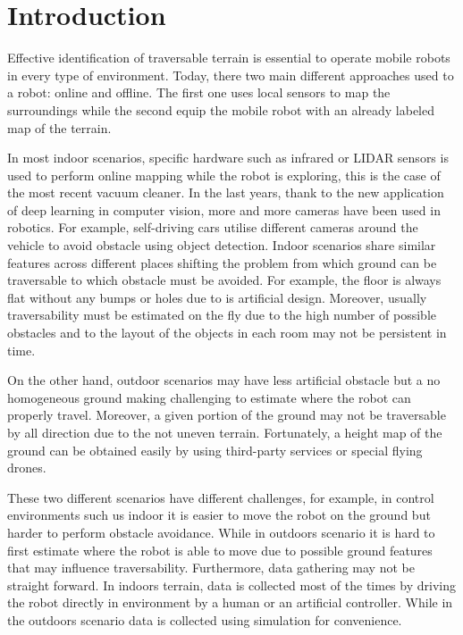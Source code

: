 \documentclass[../document.tex]{subfiles}
\begin{document}
\section{Introduction}
Effective identification of traversable terrain is essential to operate mobile robots in every type of environment. Today, there two main different approaches used to a robot: online and offline. The first one uses local sensors to map the surroundings while the second equip the mobile robot with an already labeled map of the terrain. 

In most indoor scenarios, specific hardware such as infrared or LIDAR sensors is used to perform online mapping while the robot is exploring, this is the case of the most recent vacuum cleaner. In the last years, thank to the new application of deep learning in computer vision, more and more cameras have been used in robotics. For example, self-driving cars utilise different cameras around the vehicle to avoid obstacle using object detection. Indoor scenarios share similar features across different places shifting the problem from which ground can be traversable to which obstacle must be avoided. For example, the floor is always flat without any bumps or holes due to is artificial design. Moreover, usually traversability must be estimated on the fly due to the high number of possible obstacles and to the layout of the objects in each room may not be persistent in time. 

On the other hand, outdoor scenarios may have less artificial obstacle but a no homogeneous ground making challenging to estimate where the robot can properly travel. Moreover, a given portion of the ground may not be traversable by all direction due to the not uneven terrain. Fortunately, a height map of the ground can be obtained easily by using third-party services or special flying drones. 

These two different scenarios have different challenges, for example, in control environments such us indoor it is easier to move the robot on the ground but harder to perform obstacle
avoidance. While in outdoors scenario it is hard to first estimate where the robot is able to move due to possible ground features that may influence traversability. Furthermore, data gathering may not be straight forward. In indoors terrain, data is collected most of the times by driving the robot directly in environment by a human or an artificial controller. While in the outdoors scenario data is collected using simulation for convenience.
\end{document}
